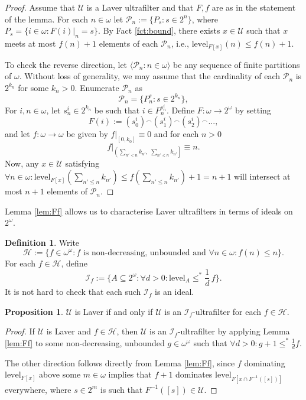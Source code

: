 \documentclass[12pt]{article}
\theoremstyle{definition}
\newtheorem{prp}[nummer]{\sc Proposition}
\newtheorem{defi}[nummer]{\sc Definition}
\newcommand\level{\text{level}}
\begin{document}
\begin{proof}
	Assume that $\mathcal{U}$ is a Laver ultrafilter and that $F,f$ are as in the statement of the lemma. For each $n \in \omega$ let $\mathcal{P}_n:=\{P_s: s \in 2^n\}$, where $P_s=\{i \in \omega: F(i)|_n=s\}$. By Fact \ref{fct:bound}, there exists $x \in \mathcal{U}$ such that $x$ meets at most $f(n)+1$ elements of each $\mathcal{P}_n$, i.e., $\level_{F[x]}(n)\leq f(n)+1$.
	
	To check the reverse direction, let $\langle\mathcal{P}_n: n \in \omega \rangle$ be any sequence of finite partitions of $\omega$. Without loss of generality, we may assume that the cardinality of each $\mathcal{P}_n$ is $2^{k_n}$ for some $k_n > 0$. Enumerate $\mathcal{P}_n$ as 
	\[\mathcal{P}_n=\{P_n^s: s \in 2^{k_n}\},\]
For $i,n \in \omega$, let $s_n^i \in 2^{k_n}$ be such that $i \in P_n^{s_n^i}$. Define $F: \omega \to 2^\omega$ by setting
\[F(i):=(s_0^i) {^{\smallfrown}} (s_1^i) {^{\smallfrown}} (s_2^i) {^{\smallfrown}} ...,\]
and let $f: \omega \to \omega$ be given by $f|_{[0,k_0]}\equiv 0$ and for each $n > 0$
\[f|_{\left(\sum_{n' < n}k_{n'},\; \sum_{n' \leq n}k_{n'}\right]}\equiv n.\]
Now, any $x \in \mathcal{U}$ satisfying $\forall n \in \omega: \level_{F[x]}(\sum_{n'\leq n}k_{n'})\leq f(\sum_{n'\leq n}k_{n'})+1=n+1$ will intersect at most $n+1$ elements of $\mathcal{P}_n$.
\end{proof}

Lemma \ref{lem:Ff} allows us to characterise Laver ultrafilters in terms of ideals on $2^\omega$.

\begin{defi}
Write
\[\mathcal{H}:=\{f \in \omega^{\omega}: f \text{ is non-decreasing, unbounded and } \forall n \in \omega: f(n)\leq n\}.\]
For each $f \in \mathcal{H}$, define 
\[\mathcal{I}_f:=\{A \subseteq 2^\omega: \forall d>0: \level_A \leq^{\ast} \frac{1}{d} \,f\}.\]
It is not hard to check that each such $\mathcal{I}_f$ is an ideal.
\end{defi}

\begin{prp}\label{prp:baumgartnerstyle}
	$\mathcal{U}$ is Laver if and only if $\mathcal{U}$ is an $\mathcal{I}_f$-ultrafilter for each $f \in \mathcal{H}$.
\end{prp}

\begin{proof}
If $\mathcal{U}$ is Laver and $f \in \mathcal{H}$, then $\mathcal{U}$ is an $\mathcal{I}_f$-ultrafilter by applying Lemma \ref{lem:Ff} to some non-decreasing, unbounded $g \in \omega^{\omega}$ such that $\forall d >0: g+1 \leq^{\ast} \frac{1}{d}f$. 

The other direction follows directly from Lemma \ref{lem:Ff}, since $f$  dominating $\level_{F[x]}$ above some $m \in \omega$ implies that $f+1$ dominates $\level_{F[x \cap F^{-1}([s])]}$ everywhere, where $s \in 2^m$ is such that $F^{-1}([s])\in \mathcal{U}$.
\end{proof}
\end{document}
